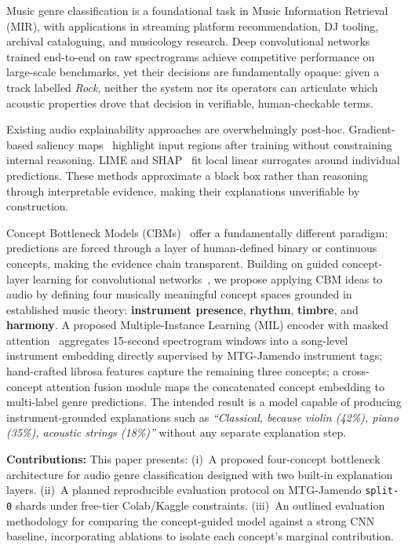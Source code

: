 \documentclass[sigconf,nonacm]{acmart}
\begin{document}
Music genre classification is a foundational task in Music Information Retrieval (MIR),
with applications in streaming platform recommendation, DJ tooling, archival cataloguing, and
musicology research. Deep convolutional networks trained end-to-end on raw spectrograms achieve
competitive performance on large-scale benchmarks, yet their decisions are fundamentally opaque:
given a track labelled \textit{Rock}, neither the system nor its operators can articulate which
acoustic properties drove that decision in verifiable, human-checkable terms.

Existing audio explainability approaches are overwhelmingly post-hoc. Gradient-based saliency
maps~\cite{simonyan2014saliency} highlight input regions after training without constraining
internal reasoning. LIME and SHAP~\cite{ribeiro2016lime} fit local linear surrogates around
individual predictions. These methods approximate a black box rather than reasoning through
interpretable evidence, making their explanations unverifiable by construction.

Concept Bottleneck Models (CBMs)~\cite{koh2020concept} offer a fundamentally different paradigm:
predictions are forced through a layer of human-defined binary or continuous concepts, making the
evidence chain transparent. Building on guided concept-layer learning for convolutional
networks~\cite{wickramanayake2021comprehensible}, we propose applying CBM ideas to audio by
defining four musically meaningful concept spaces grounded in established music theory:
\textbf{instrument presence}, \textbf{rhythm}, \textbf{timbre}, and \textbf{harmony}.
A proposed Multiple-Instance Learning (MIL) encoder with masked attention~\cite{ilse2018mil}
aggregates 15-second spectrogram windows into a song-level instrument embedding directly
supervised by MTG-Jamendo instrument tags; hand-crafted librosa features capture the remaining
three concepts; a cross-concept attention fusion module maps the concatenated concept embedding
to multi-label genre predictions. The intended result is a model capable of producing
instrument-grounded explanations such as \emph{``Classical, because violin (42\%), piano (35\%),
acoustic strings (18\%)''} without any separate explanation step.

\textbf{Contributions:} This paper presents:
(i)~A proposed four-concept bottleneck architecture for audio genre classification designed with
two built-in explanation layers.
(ii)~A planned reproducible evaluation protocol on MTG-Jamendo \texttt{split-0} shards under
free-tier Colab/Kaggle constraints.
(iii)~An outlined evaluation methodology for comparing the concept-guided model against a strong
CNN baseline, incorporating ablations to isolate each concept's marginal contribution.
\end{document}
